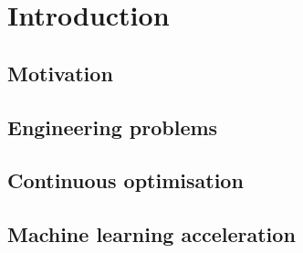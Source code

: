 \documentclass[../../main.tex]{subfiles}
\begin{document}
\chapter{Introduction}

\section{Motivation}

\section{Engineering problems}

\section{Continuous optimisation}

\section{Machine learning acceleration}
\end{document}
